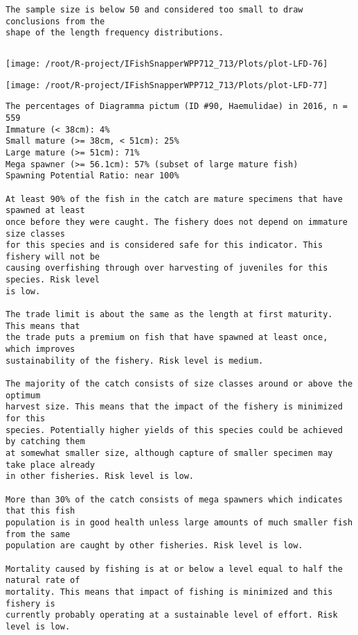\documentclass{report}\usepackage[]{graphicx}\usepackage[]{color}
\makeatletter
\def\maxwidth{ %
  \ifdim\Gin@nat@width>\linewidth
    \linewidth
  \else
    \Gin@nat@width
  \fi
}
\newenvironment{kframe}{%
 \def\at@end@of@kframe{}%
 \ifinner\ifhmode%
  \def\at@end@of@kframe{\end{minipage}}%
  \begin{minipage}{\columnwidth}%
 \fi\fi%
 \def\FrameCommand##1{\hskip\@totalleftmargin \hskip-\fboxsep
 \colorbox{shadecolor}{##1}\hskip-\fboxsep
     \hskip-\linewidth \hskip-\@totalleftmargin \hskip\columnwidth}%
 \MakeFramed {\advance\hsize-\width
   \@totalleftmargin\z@ \linewidth\hsize
   \@setminipage}}%
 {\par\unskip\endMakeFramed%
 \at@end@of@kframe}
\newenvironment{knitrout}{}{} %
\makeatother
\begin{document}
\begin{knitrout}
\begin{kframe}
\begin{verbatim}
The sample size is below 50 and considered too small to draw conclusions from the
shape of the length frequency distributions.
\end{verbatim}
\end{kframe}
\newpage
\begin{kframe}\begin{verbatim}
\end{verbatim}
\end{kframe}
\texttt{[image: /root/R-project/IFishSnapperWPP712\_713/Plots/plot-LFD-76]} 

\texttt{[image: /root/R-project/IFishSnapperWPP712\_713/Plots/plot-LFD-77]} 
\begin{kframe}\begin{verbatim}
The percentages of Diagramma pictum (ID #90, Haemulidae) in 2016, n = 559
Immature (< 38cm): 4%
Small mature (>= 38cm, < 51cm): 25%
Large mature (>= 51cm): 71%
Mega spawner (>= 56.1cm): 57% (subset of large mature fish)
Spawning Potential Ratio: near 100%
 
At least 90% of the fish in the catch are mature specimens that have spawned at least
once before they were caught. The fishery does not depend on immature size classes
for this species and is considered safe for this indicator. This fishery will not be
causing overfishing through over harvesting of juveniles for this species. Risk level
is low.

The trade limit is about the same as the length at first maturity.  This means that
the trade puts a premium on fish that have spawned at least once, which improves
sustainability of the fishery. Risk level is medium.

The majority of the catch consists of size classes around or above the optimum
harvest size. This means that the impact of the fishery is minimized for this
species. Potentially higher yields of this species could be achieved by catching them
at somewhat smaller size, although capture of smaller specimen may take place already
in other fisheries. Risk level is low.

More than 30% of the catch consists of mega spawners which indicates that this fish
population is in good health unless large amounts of much smaller fish from the same
population are caught by other fisheries. Risk level is low.
 
Mortality caused by fishing is at or below a level equal to half the natural rate of
mortality. This means that impact of fishing is minimized and this fishery is
currently probably operating at a sustainable level of effort. Risk level is low.
 

\end{verbatim}
\end{kframe}
\end{knitrout}
\end{document}
